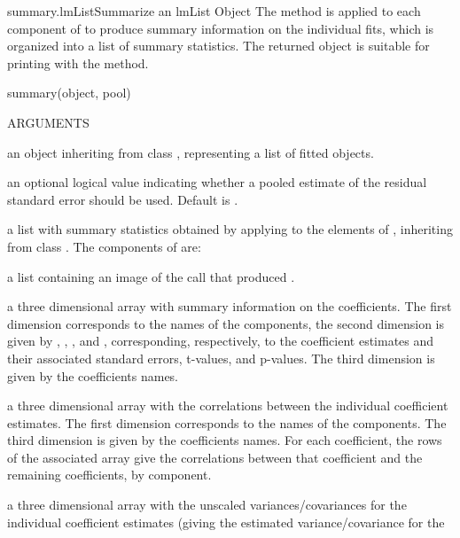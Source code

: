 \documentclass[pdftex]{article} \usepackage{url,graphicx}
\begin{document}
\begin{Helpfile}{summary.lmList}{Summarize an lmList Object}
The  method is applied to each  component of
 to produce summary information on the individual fits,
which is organized into a list of summary statistics. The returned
object is suitable for printing with the 
method.
\begin{Example}
summary(object, pool)
\end{Example}
\begin{Argument}{ARGUMENTS}
\item[\Co{object:}]
an object inheriting from class , representing
a list of  fitted objects.
\item[\Co{pool:}]
an optional logical value indicating whether a pooled
estimate of the residual standard error should be used. Default is
.
\end{Argument}
a list with summary statistics obtained by applying 
to the elements of , inheriting from class
. The components of  are:
\begin{Argument}{}
\vspace{-16pt} 
\item[\Co{call:}]
a list containing an image of the  call that
produced .
\item[\Co{coefficients:}]
a three dimensional array with summary information
on the  coefficients. The first dimension corresponds to
the names of the  components, the second dimension is
given by   , , ,
and , corresponding, respectively, to the
coefficient estimates and their associated standard errors,
t-values, and p-values. The third dimension is given by the
coefficients names.
\item[\Co{correlation:}]
a three dimensional array with the 
correlations between the individual  coefficient
estimates. The first dimension corresponds to the names of the
 components. The third dimension is given by the
coefficients names. For each coefficient, the rows of the associated
array give the correlations between that coefficient and the
remaining coefficients, by  component.
\item[\Co{cov.unscaled:}]
a three dimensional array with the unscaled
variances/covariances for the individual  coefficient
estimates (giving the estimated variance/covariance for the

\end{Argument}
\end{Helpfile}
\end{document}
